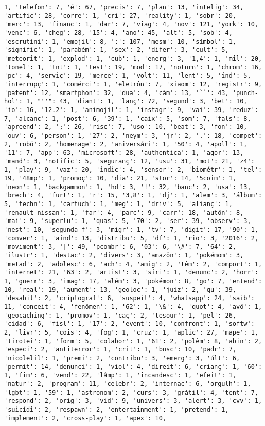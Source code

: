 \documentclass[11pt]{article}
\begin{document}
\begin{Verbatim}[commandchars=\\\{\}]
1, 'telefon': 7, 'é': 67, 'precis': 7, 'plan': 13, 'intelig': 34, 'artific': 28, 'corre': 1, 'cri': 27, 'reality': 1, 'sobr': 20, 'merc': 13, 'financ': 1, 'dar': 7, 'viag': 4, 'nov': 121, 'york': 10, 'venc': 6, 'cheg': 28, '15': 4, 'ano': 45, 'alt': 5, 'sob': 4, 'escrutíni': 1, 'emojil': 8, ':': 107, 'mesm': 10, 'símbol': 1, 'signific': 1, 'parabém': 1, 'sex': 2, 'difer': 3, 'cult': 5, 'meteorit': 1, 'explod': 1, 'cub': 1, 'energ': 3, '1,4': 1, 'mil': 20, 'tonel': 1, 'tnt': 1, 'test': 19, 'mod': 17, 'noturn': 1, 'chrom': 16, 'pc': 4, 'serviç': 19, 'merce': 1, 'volt': 11, 'lent': 5, 'índ': 5, 'interrupç': 1, 'comérci': 1, 'eletrôn': 7, 'xiaom': 12, 'registr': 9, 'patent': 12, 'smartphon': 32, 'dua': 4, 'câm': 13, '``': 43, 'punch-hol': 1, "''": 43, 'diant': 1, 'lanç': 72, 'segund': 3, 'bet': 10, 'io': 16, '12.2': 1, 'animojil': 1, 'instagr': 9, 'vai': 39, 'reduz': 7, 'alcanc': 1, 'post': 6, '39': 1, 'caix': 5, 'som': 7, 'fals': 8, 'apreend': 2, ';': 26, 'risc': 7, 'uso': 10, 'beat': 3, 'fon': 10, 'ouv': 6, 'person': 1, '27': 2, 'neym': 3, 'jr': 2, '.': 18, 'compet': 2, 'robó': 2, 'homenage': 2, 'aniversári': 1, '50': 4, 'apoll': 1, '11': 7, 'app': 63, 'microsoft': 28, 'authentica': 1, 'agor': 13, 'mand': 3, 'notific': 5, 'seguranç': 12, 'usu': 31, 'mot': 21, 'z4': 1, 'play': 9, 'vaz': 20, 'indic': 4, 'sensor': 2, 'biométr': 1, 'tel': 19, '48mp': 1, 'promoç': 10, 'dia': 21, 'stor': 14, '5coim': 1, 'neon': 1, 'backgammon': 1, 'hd': 3, '!': 32, 'banc': 2, 'usa': 13, 'brech': 4, 'furt': 1, 'r': 15, '3,8': 1, 'dj': 1, 'alem': 3, 'álbum': 5, 'techn': 1, 'cartuch': 1, 'meg': 1, 'driv': 5, 'alianç': 1, 'renault-nissan': 1, 'far': 4, 'parc': 9, 'carr': 18, 'autôn': 8, 'mai': 9, 'superlu': 1, 'quas': 5, '70': 2, 'ser': 39, 'observ': 3, 'nest': 10, 'segunda-f': 3, 'migr': 1, 'tv': 7, 'digit': 17, '90': 1, 'conver': 1, 'aind': 13, 'distribu': 5, 'df': 1, 'rio': 3, '2016': 2, 'moviment': 3, '|': 49, 'pcombr': 6, '03': 6, '\#': 7, '64': 2, 'ilustr': 1, 'destac': 2, 'divers': 3, 'amazôn': 1, 'pokémom': 3, 'metad': 2, 'adolesc': 6, 'ach': 4, 'amig': 2, 'têm': 2, 'comport': 1, 'internet': 21, '63': 2, 'artist': 3, 'síri': 1, 'denunc': 2, 'horr': 1, 'guerr': 3, 'imag': 17, 'além': 3, 'pokémon': 8, 'go': 7, 'entend': 10, 'real': 19, 'aument': 13, 'geoloc': 1, 'juiz': 2, 'qu': 39, 'desabil': 2, 'criptograf': 6, 'suspeit': 4, 'whatsapp': 24, 'saib': 11, 'conceit': 4, 'fenômen': 1, '62': 1, '\&': 4, 'quot': 4, 'avô': 1, 'geocaching': 1, 'promov': 1, 'caç': 2, 'tesour': 1, 'pel': 26, 'cidad': 6, 'fisl': 1, '17': 2, 'event': 10, 'confront': 1, 'softw': 2, 'livr': 5, 'cois': 4, 'fog': 1, 'cruz': 1, 'aplic': 27, 'mape': 1, 'tirotei': 1, 'form': 5, 'colabor': 1, '61': 2, 'polêm': 8, 'abin': 2, 'especi': 2, 'antiterror': 1, 'crit': 1, 'busc': 10, 'padr': 7, 'nicolelil': 1, 'premi': 2, 'contribu': 3, 'emerg': 3, 'últ': 6, 'permit': 14, 'denunci': 1, 'viol': 4, 'direit': 6, 'crianç': 1, '60': 1, 'fim': 6, 'vend': 22, 'lâmp': 1, 'incandesc': 1, 'efeit': 1, 'natur': 2, 'program': 11, 'celebr': 2, 'internac': 6, 'orgulh': 1, 'lgbt': 1, '59': 1, 'astronom': 2, 'curs': 3, 'grátil': 4, 'tent': 7, 'respond': 2, 'orig': 3, 'vid': 9, 'univers': 3, 'alert': 3, 'cvv': 1, 'suicídi': 2, 'respawn': 2, 'entertainment': 1, 'pretend': 1, 'implement': 2, 'cross-play': 1, 'apex': 10, 
\end{Verbatim}
\end{document}
